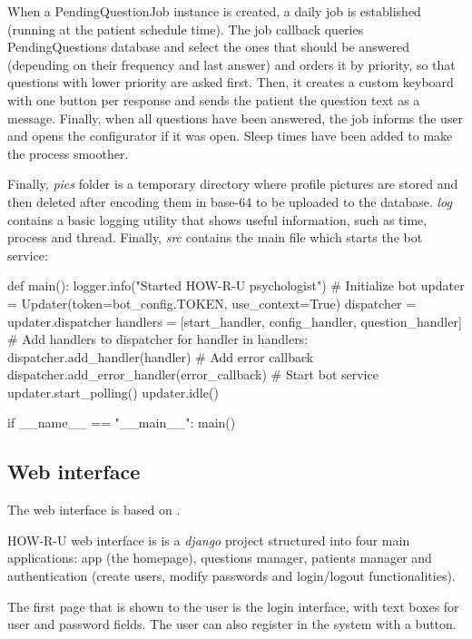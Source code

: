 \documentclass[12pt,english]{article}
\begin{document}
When a PendingQuestionJob instance is created, a daily job is established (running at the patient schedule time). The job callback queries PendingQuestions database and select the ones that should be answered (depending on their frequency and last answer) and orders it by priority, so that questions with lower priority are asked first. Then, it creates a custom keyboard with one button per response and sends the patient the question text as a message. Finally, when all questions have been answered, the job informs the user and opens the configurator if it was open. Sleep times have been added to make the process smoother.


Finally, \emph{pics} folder is a temporary directory where profile pictures are stored and then deleted after encoding them in base-64 to be uploaded to the database. \emph{log} contains a basic logging utility that shows useful information, such as time, process and thread. Finally, \emph{src} contains the main file which starts the bot service:

\begin{python}[caption={Bot file, the one that starts the service}, captionpos=b]
def main():
    logger.info("Started HOW-R-U psychologist")
    # Initialize bot
    updater = Updater(token=bot_config.TOKEN, use_context=True)
    dispatcher = updater.dispatcher
    handlers = [start_handler, config_handler, question_handler]
    # Add handlers to dispatcher
    for handler in handlers:
        dispatcher.add_handler(handler)
    # Add error callback
    dispatcher.add_error_handler(error_callback)
    # Start bot service
    updater.start_polling()
    updater.idle()

if __name__ == "__main__":
    main()
\end{python}
\newpage
\subsection{Web interface}

The web interface is based on \cite{appseed}.

HOW-R-U web interface is is a \emph{django} project structured into four main applications: app (the homepage), questions manager, patients manager and authentication (create users, modify passwords and login/logout functionalities).

The first page that is shown to the user is the login interface, with text boxes for user and password fields. The user can also register in the system with a button.
\end{document}
